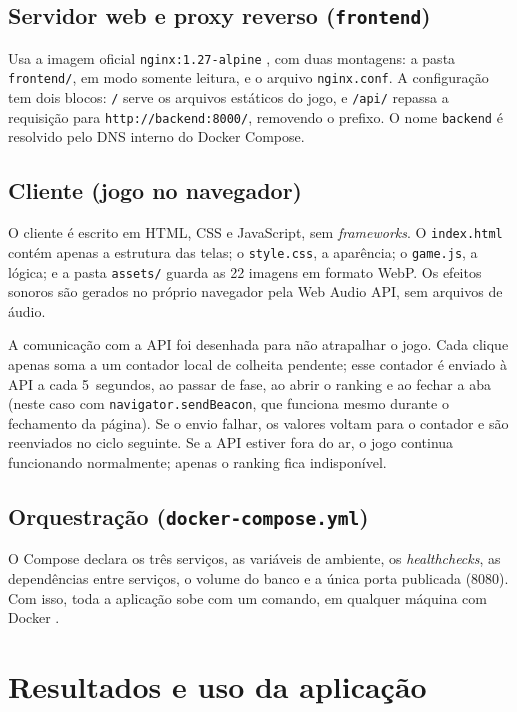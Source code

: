 \documentclass[12pt]{article}
\begin{document}
\subsection{Servidor web e proxy reverso (\texttt{frontend})}

Usa a imagem oficial \texttt{nginx:1.27-alpine} \cite{nginx}, com duas
montagens: a pasta \texttt{frontend/}, em modo somente leitura, e o
arquivo \texttt{nginx.conf}. A configuração tem dois blocos: \texttt{/}
serve os arquivos estáticos do jogo, e \texttt{/api/} repassa a requisição
para \texttt{http://backend:8000/}, removendo o prefixo. O nome
\texttt{backend} é resolvido pelo DNS interno do Docker Compose.

\subsection{Cliente (jogo no navegador)}

O cliente é escrito em HTML, CSS e JavaScript, sem \emph{frameworks}. O
\texttt{index.html} contém apenas a estrutura das telas; o
\texttt{style.css}, a aparência; o \texttt{game.js}, a lógica; e a pasta
\texttt{assets/} guarda as 22 imagens em formato WebP. Os efeitos sonoros
são gerados no próprio navegador pela Web Audio API, sem arquivos de
áudio.

A comunicação com a API foi desenhada para não atrapalhar o jogo. Cada
clique apenas soma a um contador local de colheita pendente; esse
contador é enviado à API a cada 5~segundos, ao passar de fase, ao abrir o
ranking e ao fechar a aba (neste caso com \texttt{navigator.sendBeacon},
que funciona mesmo durante o fechamento da página). Se o envio falhar, os
valores voltam para o contador e são reenviados no ciclo seguinte. Se a
API estiver fora do ar, o jogo continua funcionando normalmente; apenas o
ranking fica indisponível.

\subsection{Orquestração (\texttt{docker-compose.yml})}

O Compose declara os três serviços, as variáveis de ambiente, os
\emph{healthchecks}, as dependências entre serviços, o volume do banco e a
única porta publicada (8080). Com isso, toda a aplicação sobe com um
comando, em qualquer máquina com Docker \cite{compose}.

\section{Resultados e uso da aplicação}\label{sec:resultados}
\end{document}
